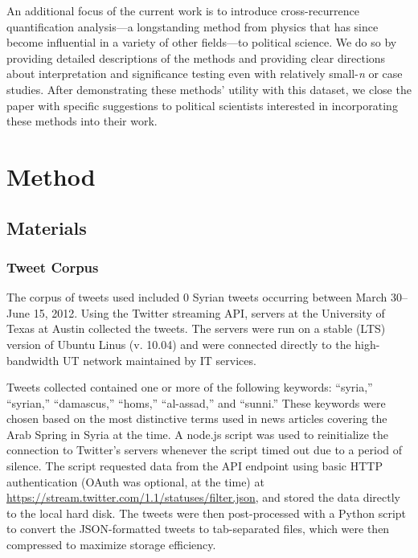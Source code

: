 \documentclass[english,man]{apa6}
\begin{document}
An additional focus of the current work is to introduce cross-recurrence
quantification analysis---a longstanding method from physics that has since
become influential in a variety of other fields---to political science. We do so
by providing detailed descriptions of the methods and providing clear directions
about interpretation and significance testing even with relatively small-\emph{n} or
case studies. After demonstrating these methods' utility with this dataset, we
close the paper with specific suggestions to political scientists interested in
incorporating these methods into their work.

\hypertarget{method}{%
\section{Method}\label{method}}

\hypertarget{materials}{%
\subsection{Materials}\label{materials}}

\hypertarget{tweet-corpus}{%
\subsubsection{Tweet Corpus}\label{tweet-corpus}}

The corpus of tweets used included 0 Syrian tweets
occurring between March 30--June 15, 2012. Using the Twitter streaming API,
servers at the University of Texas at Austin collected the tweets. The servers
were run on a stable (LTS) version of Ubuntu Linus (v. 10.04) and were connected
directly to the high-bandwidth UT network maintained by IT services.

Tweets collected contained one or more of the following keywords: \enquote{syria,}
\enquote{syrian,} \enquote{damascus,} \enquote{homs,} \enquote{al-assad,} and \enquote{sunni.} These keywords were
chosen based on the most distinctive terms used in news articles covering the
Arab Spring in Syria at the time. A node.js script was used to reinitialize the
connection to Twitter's servers whenever the script timed out due to a period of
silence. The script requested data from the API endpoint using basic HTTP
authentication (OAuth was optional, at the time) at
\url{https://stream.twitter.com/1.1/statuses/filter.json}, and stored the data
directly to the local hard disk. The tweets were then post-processed with a
Python script to convert the JSON-formatted tweets to tab-separated files, which
were then compressed to maximize storage efficiency.
\end{document}
